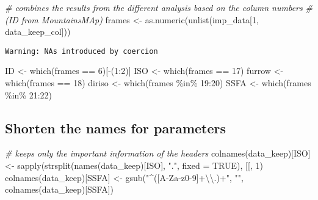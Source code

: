 \documentclass[
]{article}
\newenvironment{Shaded}{\begin{snugshade}}{\end{snugshade}}
\newcommand{\AttributeTok}[1]{\textcolor[rgb]{0.77,0.63,0.00}{#1}}
\newcommand{\CommentTok}[1]{\textcolor[rgb]{0.56,0.35,0.01}{\textit{#1}}}
\newcommand{\ConstantTok}[1]{\textcolor[rgb]{0.00,0.00,0.00}{#1}}
\newcommand{\DecValTok}[1]{\textcolor[rgb]{0.00,0.00,0.81}{#1}}
\newcommand{\FunctionTok}[1]{\textcolor[rgb]{0.00,0.00,0.00}{#1}}
\newcommand{\NormalTok}[1]{#1}
\newcommand{\OtherTok}[1]{\textcolor[rgb]{0.56,0.35,0.01}{#1}}
\newcommand{\SpecialCharTok}[1]{\textcolor[rgb]{0.00,0.00,0.00}{#1}}
\newcommand{\StringTok}[1]{\textcolor[rgb]{0.31,0.60,0.02}{#1}}
\begin{document}
\begin{Shaded}
\begin{Highlighting}[]
\CommentTok{\# combines the results from the different analysis based on the column numbers }
\CommentTok{\# (ID from MountainsMAp)}
\NormalTok{frames }\OtherTok{\textless{}{-}} \FunctionTok{as.numeric}\NormalTok{(}\FunctionTok{unlist}\NormalTok{(imp\_data[}\DecValTok{1}\NormalTok{, data\_keep\_col]))}
\end{Highlighting}
\end{Shaded}

\begin{verbatim}
Warning: NAs introduced by coercion
\end{verbatim}

\begin{Shaded}
\begin{Highlighting}[]
\NormalTok{ID }\OtherTok{\textless{}{-}} \FunctionTok{which}\NormalTok{(frames }\SpecialCharTok{==} \DecValTok{6}\NormalTok{)[}\SpecialCharTok{{-}}\NormalTok{(}\DecValTok{1}\SpecialCharTok{:}\DecValTok{2}\NormalTok{)]}
\NormalTok{ISO }\OtherTok{\textless{}{-}} \FunctionTok{which}\NormalTok{(frames }\SpecialCharTok{==} \DecValTok{17}\NormalTok{)}
\NormalTok{furrow }\OtherTok{\textless{}{-}} \FunctionTok{which}\NormalTok{(frames }\SpecialCharTok{==} \DecValTok{18}\NormalTok{)}
\NormalTok{diriso }\OtherTok{\textless{}{-}} \FunctionTok{which}\NormalTok{(frames }\SpecialCharTok{\%in\%} \DecValTok{19}\SpecialCharTok{:}\DecValTok{20}\NormalTok{)}
\NormalTok{SSFA }\OtherTok{\textless{}{-}} \FunctionTok{which}\NormalTok{(frames }\SpecialCharTok{\%in\%} \DecValTok{21}\SpecialCharTok{:}\DecValTok{22}\NormalTok{)}
\end{Highlighting}
\end{Shaded}

\hypertarget{shorten-the-names-for-parameters}{%
\subsection{Shorten the names for
parameters}\label{shorten-the-names-for-parameters}}

\begin{Shaded}
\begin{Highlighting}[]
\CommentTok{\# keeps only the important information of the headers }
\FunctionTok{colnames}\NormalTok{(data\_keep)[ISO] }\OtherTok{\textless{}{-}} \FunctionTok{sapply}\NormalTok{(}\FunctionTok{strsplit}\NormalTok{(}\FunctionTok{names}\NormalTok{(data\_keep)[ISO], }\StringTok{"."}\NormalTok{, }\AttributeTok{fixed =} \ConstantTok{TRUE}\NormalTok{), }\StringTok{\textasciigrave{}}\AttributeTok{[[}\StringTok{\textasciigrave{}}\NormalTok{, }\DecValTok{1}\NormalTok{)}
\FunctionTok{colnames}\NormalTok{(data\_keep)[SSFA] }\OtherTok{\textless{}{-}} \FunctionTok{gsub}\NormalTok{(}\StringTok{"\^{}([A{-}Za{-}z0{-}9]+}\SpecialCharTok{\textbackslash{}\textbackslash{}}\StringTok{.)+"}\NormalTok{, }\StringTok{""}\NormalTok{, }\FunctionTok{colnames}\NormalTok{(data\_keep)[SSFA])}
\end{Highlighting}
\end{Shaded}
\end{document}
